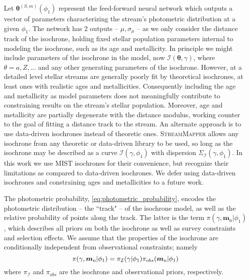 \documentclass[twocolumn]{aastex631}
\newcommand{\code}[1]{\textsc{#1}}
\newcommand{\package}[1]{\code{#1}}
\newcommand{\mrm}[1]{\mathrm{#1}}
\newcommand{\mbs}[1]{\boldsymbol{#1}}
\newcommand{\mcal}[1]{\mathcal{#1}}
\newcommand{\prior}{\mcal{\pi}}
\newcommand{\nth}[1]{{#1}_{\mrm{n}}}  %
\newcommand{\smallcomponent}[2]{#2^{\scriptscriptstyle (#1)}}
\newcommand{\cmp}[2]{\smallcomponent{#1}{#2}}
\begin{document}
            Let $\cmp{S,m}{\mbs{\theta}}(\phi_1)$ represent the feed-forward
            neural network which outputs a vector of parameters characterizing
            the stream's photometric distribution at a given $\phi_1$. The
            network has 2 outputs -- $\mu, \sigma_\mu$ -- as we only consider
            the distance track of the isochrone, holding fixed stellar
            population parameters internal to modeling the isochrone, such as
            its age and metallicity.  In principle we might include parameters
            of the isochrone in the model, now $\mcal{I}(\mbs{\theta}, \gamma)$,
            where $\theta = {a, Z, ...}$ and any other generating parameters of
            the isochrone.  However, at a detailed level stellar streams are
            generally poorly fit by theoretical isochrones, at least ones with
            realistic ages and metallicities.  Consequently including the age
            and metallicity as model parameters does not meaningfully contribute
            to constraining results on the stream's stellar population.
            Moreover, age and metallicity are partially degenerate with the
            distance modulus, working counter to the goal of fitting a distance
            track to the stream. An alternate approach is to use data-driven
            isochrones instead of theoretic ones.   \package{StreamMapper}
            allows any isochrone from any theoretic or data-driven library to be
            used, so long as the isochrone may be described as a curve
            $\mcal{I}(\gamma, \phi_1)$ with dispersion
            $\Sigma_{\mcal{I}}(\gamma, \phi_1)$. In this work we use MIST
            \citep{Dotter2016, Choi+2016} isochrones for their convenience, but
            recognize their limitations as compared to data-driven isochrones.
            We defer using data-driven isochrones and constraining ages and
            metallicities to a future work.

            The photometric probability, \autoref{eq:photometric_probability},
            encodes the photometric distribution -- the ``track" -- of the
            isochrone model, as well as the relative probability of points along
            the track. The latter is the term $\prior(\gamma, \nth{\mbs{m}} |
            \phi_1)$, which describes all priors on both the isochrone as well
            as survey constraints and selection effects. We assume that the
            properties of the isochrone are conditionally independent from
            observational constraints; namely
            \begin{equation} \label{eq:isochrone_prior_components}
                \prior(\gamma, \nth{\mbs{m}} | \phi_1) = \prior_{\cal{I}}(\gamma | \phi_1) \prior_{obs}(\nth{\mbs{m}} | \phi_1)
            \end{equation}
            where $\prior_{\mcal{I}}$ and $\prior_{obs}$ are the isochrone and
            observational priors, respectively.
            
\end{document}
